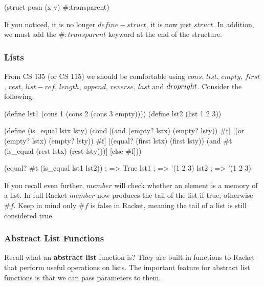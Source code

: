 \begin{code}[Lisp]
(struct posn (x y) #:transparent)
\end{code}

If you noticed, it is no longer $define-struct$, it is now just $struct$. In addition, we must add the $\#:transparent$ keyword at the end of the structure.\\

\clearpage
{}

\subsubsection*{Lists}

From CS 135 (or CS 115) we should be comfortable using $cons$, $list$, $empty$, $first$, $rest$, $list-ref$, $length$, $append$, $reverse$, $last$ and $drop\-right$. Consider the following.\\


\begin{code}[Lisp]
(define lst1 (cons 1 (cons 2 (cons 3 empty))))
(define lst2 (list 1 2 3))

(define (is_equal lstx lsty)
	(cond
		[(and (empty? lstx) (empty? lsty)) #t]
		[(or (empty? lstx) (empty? lsty)) #f]
		[(equal? (first lstx) (first lsty)) (and #t (is_equal (rest lstx)
		                                                      (rest lsty)))]
		[else #f]))
	
(equal? #t (is_equal lst1 lst2)) ; => True
lst1 ; => '(1 2 3)
lst2 ; => '(1 2 3)
\end{code}

If you recall even further, $member$ will check whether an element is a memory of a list. In full Racket $member$ now produces the tail of the list if true, otherwise $\#f$. Keep in mind only $\#f$ is false in Racket, meaning the tail of a list is still considered true.

\subsubsection*{Abstract List Functions}

Recall what an \textbf{abstract list} function is? They are built-in functions to Racket that perform useful operations on lists. The important feature for abstract list functions is that we can pass parameters to them.\\


